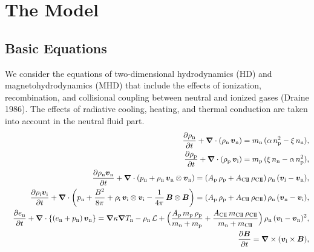 \documentclass[12pt,preprint]{aastex}
\newcommand{\bnabla}{\boldmath\mbox{$\nabla$}\unboldmath}
\newcommand{\bvel}{\boldmath\mbox{$v$}\unboldmath}
\newcommand{\bmag}{\boldmath\mbox{$B$}\unboldmath}
\begin{document}
\section{The Model}
\subsection{Basic Equations}
We consider the equations of two-dimensional hydrodynamics (HD) and magnetohydrodynamics (MHD) that include the effects of ionization, recombination, and collisional coupling between neutral and ionized gases (Draine 1986).
The effects of radiative cooling, heating, and thermal conduction are taken into account in the neutral fluid part.
\begin{eqnarray}\label{E1}
&& \frac{\partial \rho_{\rm n}}{\partial t}+\bnabla\cdot(\rho_{\rm n}\,\bvel_{\rm n})=
m_{\rm n}\,(\alpha\,n_{\rm p}^{2}-\xi\,n_{\rm n}),\\
&& \frac{\partial \rho_{\rm p}}{\partial t}+\bnabla\cdot(\rho_{\rm p}\,\bvel_{\rm i})=
m_{\rm p}\,(\xi\,n_{\rm n}-\alpha\,n_{\rm p}^{2}),\\
&& \frac{\partial \rho_{\rm n}\bvel_{\rm n}}{\partial t}+\bnabla\cdot(p_{\rm n}+\rho_{\rm n}\,\bvel_{\rm n}\otimes \bvel_{\rm n})=(A_{\rm p}\,\rho_{\rm p}+A_{\rm CI\hspace{-.1em}I}\,\rho_{\rm CI\hspace{-.1em}I})\,\rho_{\rm n}\,(\bvel_{\rm i}-\bvel_{\rm n}),\\
&& \frac{\partial\rho_{\rm i}\bvel_{\rm i}}{\partial t}+\bnabla\cdot\left(p_{\rm n}+\frac{B^{2}}{8\pi}+\rho_{\rm i}\,\bvel_{\rm i}\otimes \bvel_{\rm i}-\frac{1}{4\pi}\,\bmag\otimes\bmag\right)= (A_{\rm p}\,\rho_{\rm p}+A_{\rm CI\hspace{-.1em}I}\,\rho_{\rm CI\hspace{-.1em}I})\,\rho_{\rm n}\,(\bvel_{\rm n}-\bvel_{\rm i}),\\
&& \frac{\partial e_{\rm n}}{\partial t}+\bnabla\cdot\{(e_{\rm n}+p_{\rm n})\,\bvel_{\rm n}\}=
\bnabla\kappa\bnabla T_{\rm n}-\rho_{\rm n}\,\mathcal{L} + \Big( \frac{A_{\rm p}\,m_{\rm p}\,\rho_{\rm p}}{m_{\rm n}+m_{\rm p}}+\frac{A_{\rm CI\hspace{-.1em}I}\,m_{\rm CI\hspace{-.1em}I}\,\rho_{\rm CI\hspace{-.1em}I}}{m_{\rm n}+m_{\rm CI\hspace{-.1em}I}} \Big)\,\rho_{\rm n}\,(\bvel_{\rm i}-\bvel_{\rm n})^{2},\label{E5}\\
&& \frac{\partial\bmag}{\partial t}=\bnabla\times(\bvel_{\rm i}\times\bmag),
\end{eqnarray}
\end{document}
